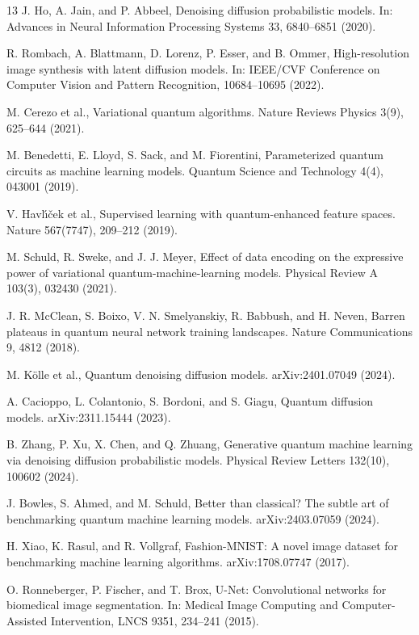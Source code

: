 \begin{thebibliography}{13}
J. Ho, A. Jain, and P. Abbeel,
Denoising diffusion probabilistic models.
In: Advances in Neural Information Processing Systems 33, 6840--6851 (2020).

R. Rombach, A. Blattmann, D. Lorenz, P. Esser, and B. Ommer,
High-resolution image synthesis with latent diffusion models.
In: IEEE/CVF Conference on Computer Vision and Pattern Recognition, 10684--10695 (2022).

M. Cerezo et al.,
Variational quantum algorithms.
Nature Reviews Physics 3(9), 625--644 (2021).

M. Benedetti, E. Lloyd, S. Sack, and M. Fiorentini,
Parameterized quantum circuits as machine learning models.
Quantum Science and Technology 4(4), 043001 (2019).

V. Havl\'{\i}\v{c}ek et al.,
Supervised learning with quantum-enhanced feature spaces.
Nature 567(7747), 209--212 (2019).

M. Schuld, R. Sweke, and J. J. Meyer,
Effect of data encoding on the expressive power of variational quantum-machine-learning models.
Physical Review A 103(3), 032430 (2021).

J. R. McClean, S. Boixo, V. N. Smelyanskiy, R. Babbush, and H. Neven,
Barren plateaus in quantum neural network training landscapes.
Nature Communications 9, 4812 (2018).

M. K\"olle et al.,
Quantum denoising diffusion models.
arXiv:2401.07049 (2024).

A. Cacioppo, L. Colantonio, S. Bordoni, and S. Giagu,
Quantum diffusion models.
arXiv:2311.15444 (2023).

B. Zhang, P. Xu, X. Chen, and Q. Zhuang,
Generative quantum machine learning via denoising diffusion probabilistic models.
Physical Review Letters 132(10), 100602 (2024).

J. Bowles, S. Ahmed, and M. Schuld,
Better than classical? The subtle art of benchmarking quantum machine learning models.
arXiv:2403.07059 (2024).

H. Xiao, K. Rasul, and R. Vollgraf,
Fashion-MNIST: A novel image dataset for benchmarking machine learning algorithms.
arXiv:1708.07747 (2017).

O. Ronneberger, P. Fischer, and T. Brox,
U-Net: Convolutional networks for biomedical image segmentation.
In: Medical Image Computing and Computer-Assisted Intervention, LNCS 9351, 234--241 (2015).
\end{thebibliography}
